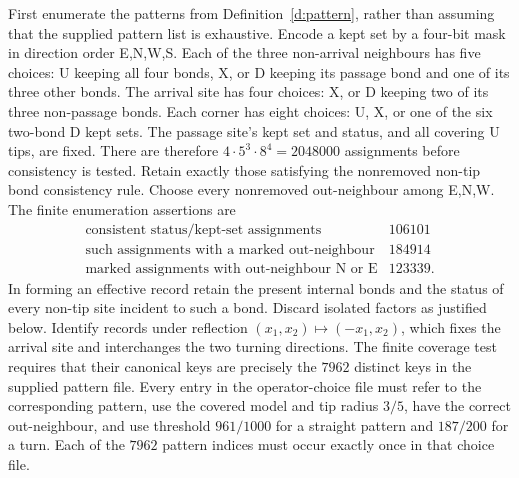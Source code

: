 First enumerate the patterns from Definition~\ref{d:pattern},
rather than assuming that the supplied pattern list is exhaustive.
Encode a kept set by a four-bit mask in direction order E,N,W,S.
Each of the three non-arrival neighbours has five choices: U
keeping all four bonds, X, or D keeping its passage bond and one
of its three other bonds. The arrival site has four choices: X,
or D keeping two of its three non-passage bonds. Each corner has
eight choices: U, X, or one of the six two-bond D kept sets.
The passage site's kept set and status, and all covering U tips,
are fixed. There are therefore
\(4\cdot5^3\cdot8^4=2048000\) assignments before consistency is
tested. Retain exactly those satisfying the nonremoved non-tip
bond consistency rule. Choose every nonremoved out-neighbour
among E,N,W. The finite enumeration assertions are
\[
 \begin{array}{c|r}
 \text{consistent status/kept-set assignments}&106101\\
 \text{such assignments with a marked out-neighbour}&184914\\
 \text{marked assignments with out-neighbour N or E}&123339.
 \end{array}
\]
In forming an effective record retain the present internal bonds
and the status of every non-tip site incident to such a bond.
Discard isolated factors as justified below. Identify records under
reflection \((x_1,x_2)\mapsto(-x_1,x_2)\), which fixes the arrival
site and interchanges the two turning directions. The finite
coverage test requires that their canonical keys are precisely
the \(7962\) distinct keys in the supplied pattern file. Every
entry in the operator-choice file must refer to the corresponding
pattern, use the covered model and tip radius \(3/5\), have the
correct out-neighbour, and use threshold \(961/1000\) for a
straight pattern and \(187/200\) for a turn. Each of the \(7962\)
pattern indices must occur exactly once in that choice file.


